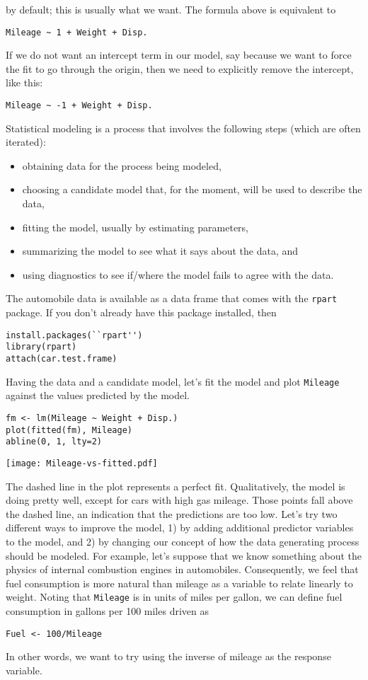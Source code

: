 by default; this is usually what we want. The formula above is equivalent to
\begin{Verbatim}
Mileage ~ 1 + Weight + Disp.
\end{Verbatim}
If we do not want an intercept term in our model, say because we want to
force the fit to go through the origin, then we need to explicitly remove
the intercept, like this:
\begin{Verbatim}
Mileage ~ -1 + Weight + Disp.
\end{Verbatim}
Statistical modeling is a process that involves the following steps (which are often
iterated):
\begin{itemize}
\item obtaining data for the process being modeled,
\item choosing a candidate model that, for the moment, will be used
  to describe the data,
\item fitting the model, usually by estimating parameters,
\item summarizing the model to see what it says about the data, and
\item using diagnostics to see if/where the model fails to agree
  with the data.
\end{itemize}
The automobile data is available as a data frame that comes with
the \texttt{rpart} package. 
If you don't already have this package installed, then
\begin{Verbatim}
install.packages(``rpart'')
library(rpart)
attach(car.test.frame)
\end{Verbatim}
Having the data and a candidate model, let's fit the model
and plot \texttt{Mileage} against the values predicted by the model.
\begin{Verbatim}[samepage=true]
fm <- lm(Mileage ~ Weight + Disp.)
plot(fitted(fm), Mileage)
abline(0, 1, lty=2)
\end{Verbatim}
\texttt{[image: Mileage-vs-fitted.pdf]}

The dashed line in the plot represents a perfect fit. Qualitatively,
the model is doing pretty well, except for cars with high gas mileage.
Those points fall above the dashed line, an indication that the
predictions are too low. Let's try two different ways to improve the model,
1) by adding additional predictor variables to the model, and 2)
by changing our concept of how the data generating process should
be modeled. For example, let's suppose that we know something about
the physics of internal combustion engines in automobiles. Consequently,
we feel that fuel consumption is more natural than mileage as a
variable to relate linearly to weight. Noting that \texttt{Mileage}
is in units of miles per gallon, we can define fuel consumption in gallons per
100 miles driven as
\begin{Verbatim}
Fuel <- 100/Mileage
\end{Verbatim}
In other words, we want to try using the inverse of mileage as the
response variable.

